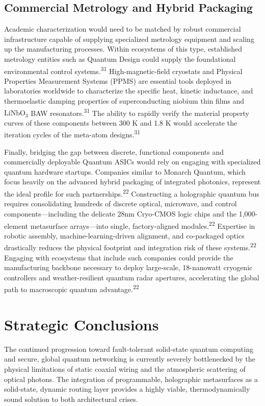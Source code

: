 \documentclass[11pt, a4paper]{article}
\begin{document}
\subsection*{Commercial Metrology and Hybrid Packaging}

Academic characterization would need to be matched by robust commercial infrastructure capable of supplying specialized metrology equipment and scaling up the manufacturing processes. Within ecosystems of this type, established metrology entities such as Quantum Design could supply the foundational environmental control systems.\textsuperscript{31} High-magnetic-field cryostats and Physical Properties Measurement Systems (PPMS) are essential tools deployed in laboratories worldwide to characterize the specific heat, kinetic inductance, and thermoelastic damping properties of superconducting niobium thin films and $\text{LiNbO}_3$ BAW resonators.\textsuperscript{31} The ability to rapidly verify the material property curves of these components between 300 K and 1.8 K would accelerate the iteration cycles of the meta-atom designs.\textsuperscript{31}

Finally, bridging the gap between discrete, functional components and commercially deployable Quantum ASICs would rely on engaging with specialized quantum hardware startups. Companies similar to Monarch Quantum, which focus heavily on the advanced hybrid packaging of integrated photonics, represent the ideal profile for such partnerships.\textsuperscript{22} Constructing a holographic quantum bus requires consolidating hundreds of discrete optical, microwave, and control components---including the delicate 28nm Cryo-CMOS logic chips and the 1,000-element metasurface arrays---into single, factory-aligned modules.\textsuperscript{22} Expertise in robotic assembly, machine-learning-driven alignment, and co-packaged optics drastically reduces the physical footprint and integration risk of these systems.\textsuperscript{22} Engaging with ecosystems that include such companies could provide the manufacturing backbone necessary to deploy large-scale, 18-nanowatt cryogenic controllers and weather-resilient quantum radar apertures, accelerating the global path to macroscopic quantum advantage.\textsuperscript{22}

\section*{Strategic Conclusions}

The continued progression toward fault-tolerant solid-state quantum computing and secure, global quantum networking is currently severely bottlenecked by the physical limitations of static coaxial wiring and the atmospheric scattering of optical photons. The integration of programmable, holographic metasurfaces as a solid-state, dynamic routing layer provides a highly viable, thermodynamically sound solution to both architectural crises.
\end{document}
